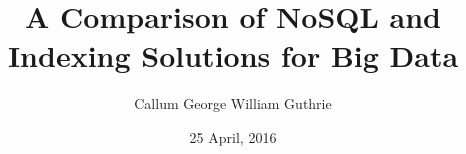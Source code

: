 \documentclass{dissertationProject}
\title{A Comparison of NoSQL and Indexing Solutions for Big Data}
\author{Callum George William Guthrie}
\date{25 April, 2016}
\begin{document}
\maketitle
\makefrontmatter











\clearpage


\end{document}
